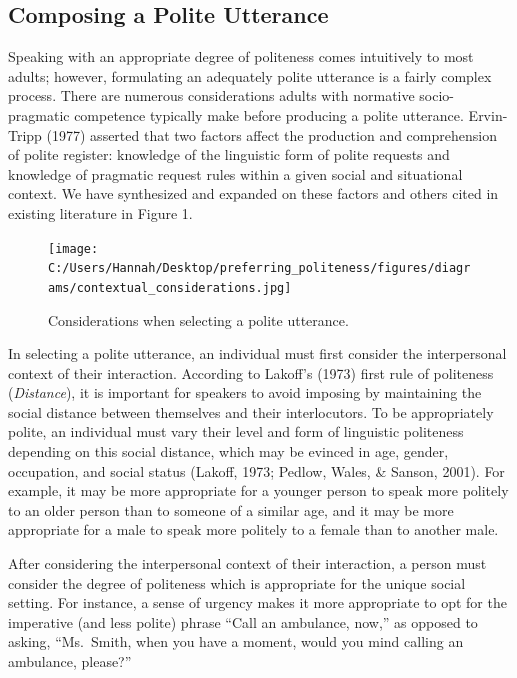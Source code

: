 \documentclass[
  english,
  man,floatsintext]{apa6}
\begin{document}
\hypertarget{composing-a-polite-utterance}{%
\subsection{Composing a Polite Utterance}\label{composing-a-polite-utterance}}

Speaking with an appropriate degree of politeness comes intuitively to most adults; however, formulating an adequately polite utterance is a fairly complex process. There are numerous considerations adults with normative socio-pragmatic competence typically make before producing a polite utterance. Ervin-Tripp (1977) asserted that two factors affect the production and comprehension of polite register: knowledge of the linguistic form of polite requests and knowledge of pragmatic request rules within a given social and situational context. We have synthesized and expanded on these factors and others cited in existing literature in Figure 1.

\begin{figure}
\centering
\texttt{[image: C:/Users/Hannah/Desktop/preferring\_politeness/figures/diagrams/contextual\_considerations.jpg]}
\caption{Considerations when selecting a polite utterance.}
\end{figure}

\newpage

In selecting a polite utterance, an individual must first consider the interpersonal context of their interaction. According to Lakoff's (1973) first rule of politeness (\emph{Distance}), it is important for speakers to avoid imposing by maintaining the social distance between themselves and their interlocutors. To be appropriately polite, an individual must vary their level and form of linguistic politeness depending on this social distance, which may be evinced in age, gender, occupation, and social status (Lakoff, 1973; Pedlow, Wales, \& Sanson, 2001). For example, it may be more appropriate for a younger person to speak more politely to an older person than to someone of a similar age, and it may be more appropriate for a male to speak more politely to a female than to another male.

After considering the interpersonal context of their interaction, a person must consider the degree of politeness which is appropriate for the unique social setting. For instance, a sense of urgency makes it more appropriate to opt for the imperative (and less polite) phrase ``Call an ambulance, now,'' as opposed to asking, ``Ms.~Smith, when you have a moment, would you mind calling an ambulance, please?''
\end{document}
